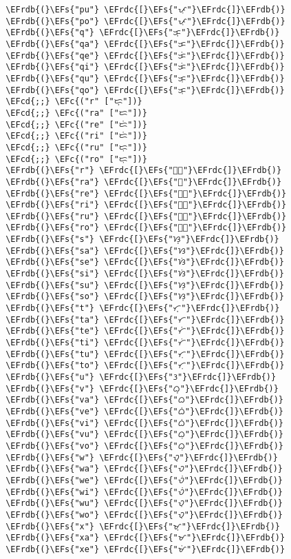\documentclass[a4wide,10pt]{article}
\newcommand{\EFc}[1]{\textcolor{EFc}{#1}} %
\newcommand{\EFcd}[1]{\textcolor{EFcd}{#1}} %
\newcommand{\EFs}[1]{\textcolor{EFs}{#1}} %
\newcommand{\EFrdb}[1]{\textcolor{EFrdb}{#1}} %
\newcommand{\EFrdc}[1]{\textcolor{EFrdc}{#1}} %
\begin{document}
\begin{Code}
\begin{Verbatim}
 \EFrdb{(}\EFs{"pu"} \EFrdc{[}\EFs{"ᜉᜓ"}\EFrdc{]}\EFrdb{)}
 \EFrdb{(}\EFs{"po"} \EFrdc{[}\EFs{"ᜉᜓ"}\EFrdc{]}\EFrdb{)}
 \EFrdb{(}\EFs{"q"} \EFrdc{[}\EFs{"ᜃ᜔"}\EFrdc{]}\EFrdb{)}
 \EFrdb{(}\EFs{"qa"} \EFrdc{[}\EFs{"ᜃ"}\EFrdc{]}\EFrdb{)}
 \EFrdb{(}\EFs{"qe"} \EFrdc{[}\EFs{"ᜃᜒ"}\EFrdc{]}\EFrdb{)}
 \EFrdb{(}\EFs{"qi"} \EFrdc{[}\EFs{"ᜃᜒ"}\EFrdc{]}\EFrdb{)}
 \EFrdb{(}\EFs{"qu"} \EFrdc{[}\EFs{"ᜃᜓ"}\EFrdc{]}\EFrdb{)}
 \EFrdb{(}\EFs{"qo"} \EFrdc{[}\EFs{"ᜃᜓ"}\EFrdc{]}\EFrdb{)}
 \EFcd{;;} \EFc{("r" ["ᜇ᜔"])}
 \EFcd{;;} \EFc{("ra" ["ᜇ"])}
 \EFcd{;;} \EFc{("re" ["ᜇᜒ"])}
 \EFcd{;;} \EFc{("ri" ["ᜇᜒ"])}
 \EFcd{;;} \EFc{("ru" ["ᜇᜓ"])}
 \EFcd{;;} \EFc{("ro" ["ᜇᜓ"])}
 \EFrdb{(}\EFs{"r"} \EFrdc{[}\EFs{"ᜍ᜔"}\EFrdc{]}\EFrdb{)}
 \EFrdb{(}\EFs{"ra"} \EFrdc{[}\EFs{"ᜍ"}\EFrdc{]}\EFrdb{)}
 \EFrdb{(}\EFs{"re"} \EFrdc{[}\EFs{"ᜍᜒ"}\EFrdc{]}\EFrdb{)}
 \EFrdb{(}\EFs{"ri"} \EFrdc{[}\EFs{"ᜍᜒ"}\EFrdc{]}\EFrdb{)}
 \EFrdb{(}\EFs{"ru"} \EFrdc{[}\EFs{"ᜍᜓ"}\EFrdc{]}\EFrdb{)}
 \EFrdb{(}\EFs{"ro"} \EFrdc{[}\EFs{"ᜍᜓ"}\EFrdc{]}\EFrdb{)}
 \EFrdb{(}\EFs{"s"} \EFrdc{[}\EFs{"ᜐ᜔"}\EFrdc{]}\EFrdb{)}
 \EFrdb{(}\EFs{"sa"} \EFrdc{[}\EFs{"ᜐ"}\EFrdc{]}\EFrdb{)}
 \EFrdb{(}\EFs{"se"} \EFrdc{[}\EFs{"ᜐᜒ"}\EFrdc{]}\EFrdb{)}
 \EFrdb{(}\EFs{"si"} \EFrdc{[}\EFs{"ᜐᜒ"}\EFrdc{]}\EFrdb{)}
 \EFrdb{(}\EFs{"su"} \EFrdc{[}\EFs{"ᜐᜓ"}\EFrdc{]}\EFrdb{)}
 \EFrdb{(}\EFs{"so"} \EFrdc{[}\EFs{"ᜐᜓ"}\EFrdc{]}\EFrdb{)}
 \EFrdb{(}\EFs{"t"} \EFrdc{[}\EFs{"ᜆ᜔"}\EFrdc{]}\EFrdb{)}
 \EFrdb{(}\EFs{"ta"} \EFrdc{[}\EFs{"ᜆ"}\EFrdc{]}\EFrdb{)}
 \EFrdb{(}\EFs{"te"} \EFrdc{[}\EFs{"ᜆᜒ"}\EFrdc{]}\EFrdb{)}
 \EFrdb{(}\EFs{"ti"} \EFrdc{[}\EFs{"ᜆᜒ"}\EFrdc{]}\EFrdb{)}
 \EFrdb{(}\EFs{"tu"} \EFrdc{[}\EFs{"ᜆᜓ"}\EFrdc{]}\EFrdb{)}
 \EFrdb{(}\EFs{"to"} \EFrdc{[}\EFs{"ᜆᜓ"}\EFrdc{]}\EFrdb{)}
 \EFrdb{(}\EFs{"u"} \EFrdc{[}\EFs{"ᜂ"}\EFrdc{]}\EFrdb{)}
 \EFrdb{(}\EFs{"v"} \EFrdc{[}\EFs{"ᜊ᜔"}\EFrdc{]}\EFrdb{)}
 \EFrdb{(}\EFs{"va"} \EFrdc{[}\EFs{"ᜊ"}\EFrdc{]}\EFrdb{)}
 \EFrdb{(}\EFs{"ve"} \EFrdc{[}\EFs{"ᜊᜒ"}\EFrdc{]}\EFrdb{)}
 \EFrdb{(}\EFs{"vi"} \EFrdc{[}\EFs{"ᜊᜒ"}\EFrdc{]}\EFrdb{)}
 \EFrdb{(}\EFs{"vu"} \EFrdc{[}\EFs{"ᜊᜓ"}\EFrdc{]}\EFrdb{)}
 \EFrdb{(}\EFs{"vo"} \EFrdc{[}\EFs{"ᜊᜓ"}\EFrdc{]}\EFrdb{)}
 \EFrdb{(}\EFs{"w"} \EFrdc{[}\EFs{"ᜏ᜔"}\EFrdc{]}\EFrdb{)}
 \EFrdb{(}\EFs{"wa"} \EFrdc{[}\EFs{"ᜏ"}\EFrdc{]}\EFrdb{)}
 \EFrdb{(}\EFs{"we"} \EFrdc{[}\EFs{"ᜏᜒ"}\EFrdc{]}\EFrdb{)}
 \EFrdb{(}\EFs{"wi"} \EFrdc{[}\EFs{"ᜏᜒ"}\EFrdc{]}\EFrdb{)}
 \EFrdb{(}\EFs{"wu"} \EFrdc{[}\EFs{"ᜏᜓ"}\EFrdc{]}\EFrdb{)}
 \EFrdb{(}\EFs{"wo"} \EFrdc{[}\EFs{"ᜏᜓ"}\EFrdc{]}\EFrdb{)}
 \EFrdb{(}\EFs{"x"} \EFrdc{[}\EFs{"ᜋ᜔"}\EFrdc{]}\EFrdb{)}
 \EFrdb{(}\EFs{"xa"} \EFrdc{[}\EFs{"ᜋ"}\EFrdc{]}\EFrdb{)}
 \EFrdb{(}\EFs{"xe"} \EFrdc{[}\EFs{"ᜋᜒ"}\EFrdc{]}\EFrdb{)}

\end{Verbatim}
\end{Code}
\end{document}
